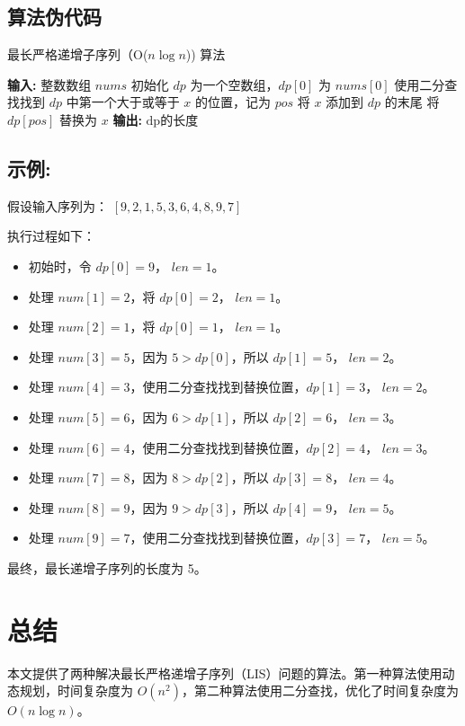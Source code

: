 \documentclass[UTF8]{ctexart}
\begin{document}
\subsection{算法伪代码}
\begin{algorithm}
\caption{最长严格递增子序列（O($n \log n$)) 算法}
\begin{algorithmic}[1]
\STATE \textbf{输入:} 整数数组 \( nums \)
\STATE 初始化 \( dp \) 为一个空数组，\( dp[0] \) 为 \( nums[0] \)
    \STATE 使用二分查找找到 \( dp \) 中第一个大于或等于 \( x \) 的位置，记为 \( pos \)
        \STATE 将 \( x \) 添加到 \( dp \) 的末尾
    \ELSE
        \STATE 将 \( dp[pos] \) 替换为 \( x \)
    \ENDIF
\ENDFOR
\STATE \textbf{输出:} \( \text{dp的长度} \)
\end{algorithmic}
\end{algorithm}
\subsection{示例:}
假设输入序列为：
\([9, 2, 1, 5, 3, 6, 4, 8, 9, 7]\)

执行过程如下：

\begin{itemize}
    \item 初始时，令 \( dp[0] = 9 \)， \( len = 1 \)。
    \item 处理 \( num[1] = 2 \)，将 \( dp[0] = 2 \)， \( len = 1 \)。
    \item 处理 \( num[2] = 1 \)，将 \( dp[0] = 1 \)， \( len = 1 \)。
    \item 处理 \( num[3] = 5 \)，因为 \( 5 > dp[0] \)，所以 \( dp[1] = 5 \)， \( len = 2 \)。
    \item 处理 \( num[4] = 3 \)，使用二分查找找到替换位置，\( dp[1] = 3 \)， \( len = 2 \)。
    \item 处理 \( num[5] = 6 \)，因为 \( 6 > dp[1] \)，所以 \( dp[2] = 6 \)， \( len = 3 \)。
    \item 处理 \( num[6] = 4 \)，使用二分查找找到替换位置，\( dp[2] = 4 \)， \( len = 3 \)。
    \item 处理 \( num[7] = 8 \)，因为 \( 8 > dp[2] \)，所以 \( dp[3] = 8 \)， \( len = 4 \)。
    \item 处理 \( num[8] = 9 \)，因为 \( 9 > dp[3] \)，所以 \( dp[4] = 9 \)， \( len = 5 \)。
    \item 处理 \( num[9] = 7 \)，使用二分查找找到替换位置，\( dp[3] = 7 \)， \( len = 5 \)。
\end{itemize}

最终，最长递增子序列的长度为 5。

\section{总结}
本文提供了两种解决最长严格递增子序列（LIS）问题的算法。第一种算法使用动态规划，时间复杂度为 \( O(n^2) \)，第二种算法使用二分查找，优化了时间复杂度为 \( O(n \log n) \)。
\end{document}
